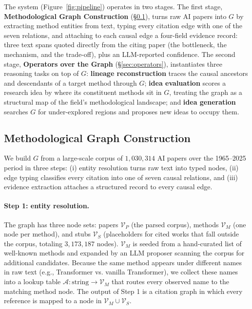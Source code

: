 \documentclass{llmxive}
\begin{document}
The system (Figure~\ref{fig:pipeline}) operates in two stages. The first stage, \textbf{Methodological Graph Construction} (§\ref{sec:graph}), turns raw AI papers into $G$ by extracting method entities from text, typing every citation edge with one of the seven relations, and attaching to each causal edge a four-field evidence record: three text spans quoted directly from the citing paper (the bottleneck, the mechanism, and the trade-off), plus an LLM-reported confidence. The second stage, \textbf{Operators over the Graph} (§\ref{sec:operators}), instantiates three reasoning tasks on top of $G$: \textbf{lineage reconstruction} traces the causal ancestors and descendants of a target method through $G$; \textbf{idea evaluation} scores a research idea by where its constituent methods sit in $G$, treating the graph as a structural map of the field's methodological landscape; and \textbf{idea generation} searches $G$ for under-explored regions and proposes new ideas to occupy them.

\subsection{Methodological Graph Construction}
\label{sec:graph}

We build $G$ from a large-scale corpus of $1{,}030{,}314$ AI papers over the 1965--2025 period in three steps: (i) entity resolution turns raw text into typed nodes, (ii) edge typing classifies every citation into one of seven causal relations, and (iii) evidence extraction attaches a structured record to every causal edge.

\paragraph{Step 1: entity resolution.}
The graph has three node sets: papers $\mathcal{V}_P$ (the parsed corpus), methods $\mathcal{V}_M$ (one node per method), and stubs $\mathcal{V}_S$ (placeholders for cited works that fall outside the corpus, totaling $3{,}173{,}187$ nodes). $\mathcal{V}_M$ is seeded from a hand-curated list of well-known methods and expanded by an LLM proposer scanning the corpus for additional candidates. Because the same method appears under different names in raw text (e.g., Transformer vs. vanilla Transformer), we collect these names into a lookup table $\mathcal{A}: \text{string} \to \mathcal{V}_M$ that routes every observed name to the matching method node. The output of Step 1 is a citation graph in which every reference is mapped to a node in $\mathcal{V}_M \cup \mathcal{V}_S$.
\end{document}
